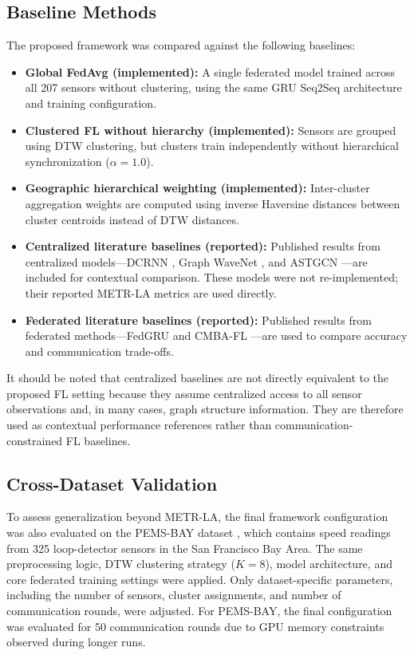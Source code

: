 \subsection{Baseline Methods}

The proposed framework was compared against the following baselines:

\begin{itemize}
    \item \textbf{Global FedAvg (implemented):} A single federated model trained across all 207 sensors without clustering, using the same GRU Seq2Seq architecture and training configuration.
    
    \item \textbf{Clustered FL without hierarchy (implemented):} Sensors are grouped using DTW clustering, but clusters train independently without hierarchical synchronization ($\alpha = 1.0$).
    
    \item \textbf{Geographic hierarchical weighting (implemented):} Inter-cluster aggregation weights are computed using inverse Haversine distances between cluster centroids instead of DTW distances.
    
    \item \textbf{Centralized literature baselines (reported):} Published results from centralized models---DCRNN \cite{li2018}, Graph WaveNet \cite{wu2019graphwavenet}, and ASTGCN \cite{guo2019}---are included for contextual comparison. These models were not re-implemented; their reported METR-LA metrics are used directly.
    
    \item \textbf{Federated literature baselines (reported):} Published results from federated methods---FedGRU and CMBA-FL \cite{zhu2025cmba}---are used to compare accuracy and communication trade-offs.
\end{itemize}

It should be noted that centralized baselines are not directly equivalent to the proposed FL setting because they assume centralized access to all sensor observations and, in many cases, graph structure information. They are therefore used as contextual performance references rather than communication-constrained FL baselines.

\subsection{Cross-Dataset Validation}

To assess generalization beyond METR-LA, the final framework configuration was also evaluated on the PEMS-BAY dataset \cite{li2018}, which contains speed readings from 325 loop-detector sensors in the San Francisco Bay Area. The same preprocessing logic, DTW clustering strategy ($K=8$), model architecture, and core federated training settings were applied. Only dataset-specific parameters, including the number of sensors, cluster assignments, and number of communication rounds, were adjusted. For PEMS-BAY, the final configuration was evaluated for 50 communication rounds due to GPU memory constraints observed during longer runs.

